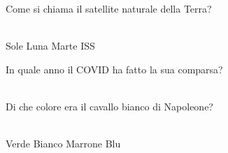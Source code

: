 \documentclass[a4paper,11pt]{exam}
\begin{document}
\begin{questions}
    
\question Come si chiama il satellite naturale della Terra?\\\
\begin{oneparchoices}
  \choice Sole
  \choice Luna
  \choice Marte
  \choice ISS
\end{oneparchoices}

    
\question In quale anno il COVID ha fatto la sua comparsa?\\\
\begin{oneparchoices}
  \choice 2020
\end{oneparchoices}

    
\question Di che colore era il cavallo bianco di Napoleone?\\\
\begin{oneparchoices}
  \choice Verde
  \choice Bianco
  \choice Marrone
  \choice Blu 
\end{oneparchoices}

    
\end{questions}

    
    \newpage
    
    
\end{document}
